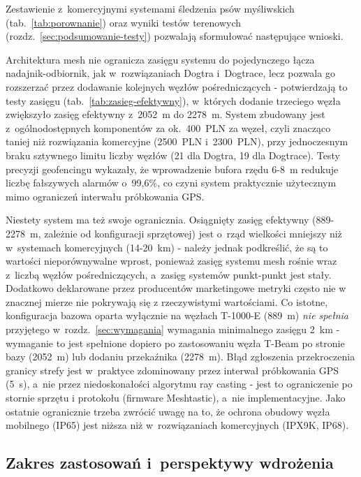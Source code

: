 Zestawienie z~komercyjnymi systemami śledzenia psów myśliwskich (tab.~\ref{tab:porownanie}) oraz
wyniki testów terenowych (rozdz.~\ref{sec:podsumowanie-testy}) pozwalają sformułować następujące
wnioski.

Architektura mesh nie ogranicza zasięgu systemu do pojedynczego łącza
nadajnik-odbiornik, jak w~rozwiązaniach Dogtra i~Dogtrace, lecz pozwala go rozszerzać przez
dodawanie kolejnych węzłów pośredniczących - potwierdzają to testy zasięgu
(tab.~\ref{tab:zasieg-efektywny}), w~których dodanie trzeciego węzła zwiększyło zasięg efektywny
z~2052~m do 2278~m. System zbudowany jest z~ogólnodostępnych komponentów za ok.\ 400~PLN za węzeł,
czyli znacząco taniej niż rozwiązania komercyjne (2500~PLN i~2300~PLN), przy jednoczesnym braku
sztywnego limitu liczby węzłów (21 dla Dogtra, 19 dla Dogtrace). Testy precyzji geofencingu wykazały, 
że wprowadzenie bufora rzędu 6-8~m redukuje liczbę fałszywych alarmów o~99,6\%, co czyni system 
praktycznie użytecznym mimo ograniczeń interwału próbkowania GPS.

Niestety system ma też swoje ogranicznia. Osiągnięty zasięg efektywny (889-2278~m, zależnie od konfiguracji
sprzętowej) jest o~rząd wielkości mniejszy niż w~systemach komercyjnych (14-20~km) - należy jednak
podkreślić, że są to wartości nieporównywalne wprost, ponieważ zasięg systemu mesh rośnie wraz
z~liczbą węzłów pośredniczących, a~zasięg systemów punkt-punkt jest stały. Dodatkowo deklarowane przez producentów
marketingowe metryki często nie w znacznej mierze nie pokrywają się z rzeczywistymi wartościami. Co istotne, konfiguracja
bazowa oparta wyłącznie na węzłach T-1000-E (889~m) \emph{nie spełnia} przyjętego w~rozdz.~\ref{sec:wymagania}
wymagania minimalnego zasięgu 2~km - wymaganie to jest spełnione dopiero po zastosowaniu węzła
T-Beam po stronie bazy (2052~m) lub dodaniu przekaźnika (2278~m). Błąd zgłoszenia przekroczenia
granicy strefy jest w~praktyce zdominowany przez interwał próbkowania GPS (5~s), a~nie przez
niedoskonałości algorytmu ray casting - jest to ograniczenie po stornie sprzętu i protokołu (firmware
Meshtastic), a~nie implementacyjne. Jako ostatnie ogranicznie trzeba zwrócić uwagę na to, że ochrona 
obudowy węzła mobilnego (IP65) jest niższa niż w~rozwiązaniach komercyjnych (IPX9K, IP68).

\subsection*{Zakres zastosowań i~perspektywy wdrożenia}

